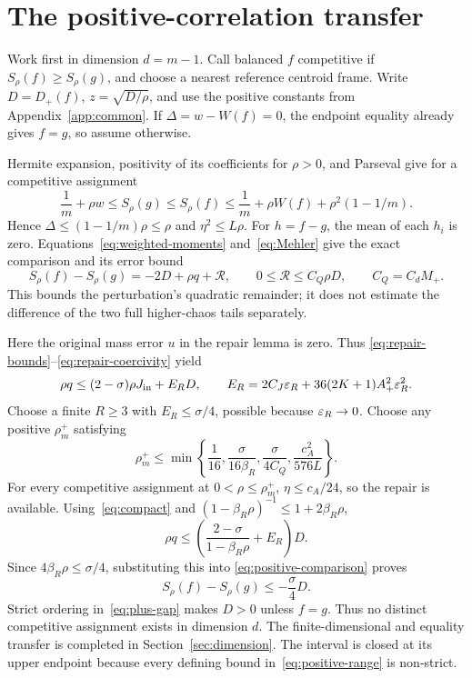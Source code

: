 \section{The positive-correlation transfer}\label{app:positive}
Work first in dimension $d=m-1$. Call balanced $f$ competitive if
$S_\rho(f)\geq S_\rho(g)$, and choose a nearest reference centroid frame.
Write $D=D_+(f)$, $z=\sqrt{D/\rho}$, and use the positive constants from
Appendix~\ref{app:common}. If $\Delta=w-W(f)=0$, the endpoint equality already
gives $f=g$, so assume otherwise.

Hermite expansion, positivity of its coefficients for $\rho>0$, and Parseval
give for a competitive assignment
\[
 \frac1m+\rho w\leq S_\rho(g)\leq S_\rho(f)
 \leq\frac1m+\rho W(f)+\rho^2(1-1/m).
\]
Hence $\Delta\leq(1-1/m)\rho\leq\rho$ and $\eta^2\leq L\rho$.
For $h=f-g$, the mean of each $h_i$ is zero. Equations~\eqref{eq:weighted-moments}
and~\eqref{eq:Mehler} give the exact comparison and its error bound
\begin{equation}\label{eq:positive-comparison}
 S_\rho(f)-S_\rho(g)=-2D+\rho q+\mathcal R,\qquad
 0\leq\mathcal R\leq C_Q\rho D,\qquad C_Q=C_dM_+.
\end{equation}
This bounds the perturbation's quadratic remainder; it does not estimate
the difference of the two full higher-chaos tails separately.

Here the original mass error $u$ in the repair lemma is zero. Thus
\eqref{eq:repair-bounds}--\eqref{eq:repair-coercivity} yield
\[
 \rho q\leq(2-\sigma)\rho J_{\rm in}+E_RD,\qquad
 E_R=2C_J\varepsilon_R+36(2K+1)A_+^2\varepsilon_R^2.
\]
Choose a finite $R\geq3$ with $E_R\leq\sigma/4$, possible because
$\varepsilon_R\to0$. Choose any positive $\rho_m^+$ satisfying
\begin{equation}\label{eq:positive-range}
 \rho_m^+\leq
 \min\left\{\frac1{16},\frac{\sigma}{16\beta_R},
                  \frac{\sigma}{4C_Q},\frac{c_A^2}{576L}\right\}.
\end{equation}
For every competitive assignment at $0<\rho\leq\rho_m^+$,
$\eta\leq c_A/24$, so the repair is available.
Using~\eqref{eq:compact} and $(1-\beta_R\rho)^{-1}\leq1+2\beta_R\rho$,
\[
 \rho q\leq\left(\frac{2-\sigma}{1-\beta_R\rho}+E_R\right)D.
\]
Since $4\beta_R\rho\leq\sigma/4$, substituting this into
\eqref{eq:positive-comparison} proves
\[
 S_\rho(f)-S_\rho(g)\leq-\frac{\sigma}{4}D.
\]
Strict ordering in~\eqref{eq:plus-gap} makes $D>0$ unless $f=g$.
Thus no distinct competitive assignment exists in dimension $d$.
The finite-dimensional and equality transfer is completed in
Section~\ref{sec:dimension}. The interval is closed at its upper endpoint
because every defining bound in~\eqref{eq:positive-range} is non-strict.

